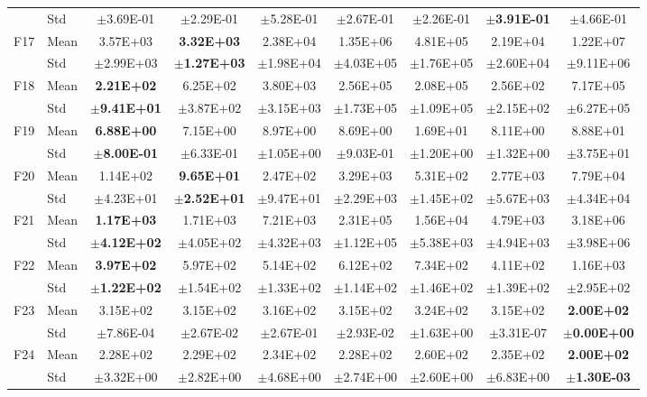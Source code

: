 \begin{table}[htbp]
{\begin{tabular}{clccccccc}
 & Std & $\pm$3.69E-01 & $\pm$2.29E-01 & $\pm$5.28E-01 & $\pm$2.67E-01 & $\pm$2.26E-01 & $\pm$\textbf{3.91E-01} & $\pm$4.66E-01 \\
F17 & Mean & 3.57E+03 & \textbf{3.32E+03} & 2.38E+04 & 1.35E+06 & 4.81E+05 & 2.19E+04 & 1.22E+07 \\
 & Std & $\pm$2.99E+03 & $\pm$\textbf{1.27E+03} & $\pm$1.98E+04 & $\pm$4.03E+05 & $\pm$1.76E+05 & $\pm$2.60E+04 & $\pm$9.11E+06 \\
F18 & Mean & \textbf{2.21E+02} & 6.25E+02 & 3.80E+03 & 2.56E+05 & 2.08E+05 & 2.56E+02 & 7.17E+05 \\
 & Std & $\pm$\textbf{9.41E+01} & $\pm$3.87E+02 & $\pm$3.15E+03 & $\pm$1.73E+05 & $\pm$1.09E+05 & $\pm$2.15E+02 & $\pm$6.27E+05 \\
F19 & Mean & \textbf{6.88E+00} & 7.15E+00 & 8.97E+00 & 8.69E+00 & 1.69E+01 & 8.11E+00 & 8.88E+01 \\
 & Std & $\pm$\textbf{8.00E-01} & $\pm$6.33E-01 & $\pm$1.05E+00 & $\pm$9.03E-01 & $\pm$1.20E+00 & $\pm$1.32E+00 & $\pm$3.75E+01 \\
F20 & Mean & 1.14E+02 & \textbf{9.65E+01} & 2.47E+02 & 3.29E+03 & 5.31E+02 & 2.77E+03 & 7.79E+04 \\
 & Std & $\pm$4.23E+01 & $\pm$\textbf{2.52E+01} & $\pm$9.47E+01 & $\pm$2.29E+03 & $\pm$1.45E+02 & $\pm$5.67E+03 & $\pm$4.34E+04 \\
F21 & Mean & \textbf{1.17E+03} & 1.71E+03 & 7.21E+03 & 2.31E+05 & 1.56E+04 & 4.79E+03 & 3.18E+06 \\
 & Std & $\pm$\textbf{4.12E+02} & $\pm$4.05E+02 & $\pm$4.32E+03 & $\pm$1.12E+05 & $\pm$5.38E+03 & $\pm$4.94E+03 & $\pm$3.98E+06 \\
F22 & Mean & \textbf{3.97E+02} & 5.97E+02 & 5.14E+02 & 6.12E+02 & 7.34E+02 & 4.11E+02 & 1.16E+03 \\
 & Std & $\pm$\textbf{1.22E+02} & $\pm$1.54E+02 & $\pm$1.33E+02 & $\pm$1.14E+02 & $\pm$1.46E+02 & $\pm$1.39E+02 & $\pm$2.95E+02 \\
F23 & Mean & 3.15E+02 & 3.15E+02 & 3.16E+02 & 3.15E+02 & 3.24E+02 & 3.15E+02 & \textbf{2.00E+02} \\
 & Std & $\pm$7.86E-04 & $\pm$2.67E-02 & $\pm$2.67E-01 & $\pm$2.93E-02 & $\pm$1.63E+00 & $\pm$3.31E-07 & $\pm$\textbf{0.00E+00} \\
F24 & Mean & 2.28E+02 & 2.29E+02 & 2.34E+02 & 2.28E+02 & 2.60E+02 & 2.35E+02 & \textbf{2.00E+02} \\
 & Std & $\pm$3.32E+00 & $\pm$2.82E+00 & $\pm$4.68E+00 & $\pm$2.74E+00 & $\pm$2.60E+00 & $\pm$6.83E+00 & $\pm$\textbf{1.30E-03} \\

\end{tabular}}
\end{table}
